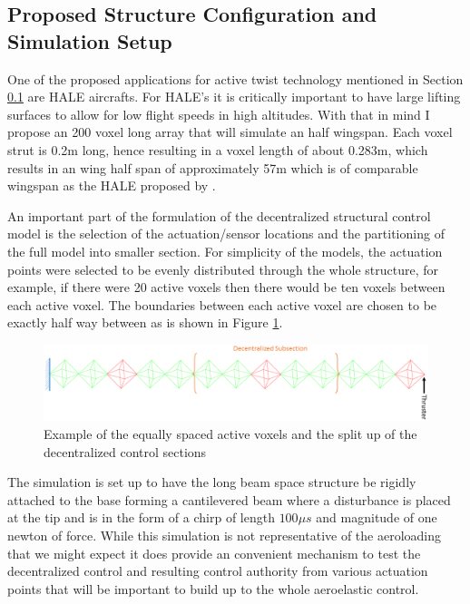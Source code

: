 \documentclass[11pt]{ucthesis}
\begin{document}
\subsection{Proposed Structure Configuration and Simulation Setup}
\label{sec:struct}
One of the proposed applications for active twist technology mentioned in Section \ref{sec:struct} are HALE aircrafts. For HALE's it is critically important to have large lifting surfaces to allow for low flight speeds in high altitudes. With that in mind I propose an 200 voxel long array that will simulate an half wingspan. Each voxel strut is 0.2m long, hence resulting in a voxel length of about 0.283m, which results in an wing half span of approximately 57m which is of comparable wingspan as the HALE proposed by \cite{goraj1999design}.

An important part of the formulation of the decentralized structural control model is the selection of the actuation/sensor locations and the partitioning of the full model into smaller section. For simplicity of the models, the actuation points were selected to be evenly distributed through the whole structure, for example, if there were 20 active voxels then there would be ten voxels between each active voxel. The boundaries between each active voxel are chosen to be exactly half way between as is shown in Figure \ref{fig:simSetup}.

\begin{figure}[thpb]
\centering
\includegraphics[width=1\linewidth]{Figures/SimulationSetup.png}
\caption{Example of the equally spaced active voxels and the split up of the decentralized control sections}
\label{fig:simSetup}
\end{figure}

The simulation is set up to have the long beam space structure be rigidly attached to the base forming a cantilevered beam where a disturbance is placed at the tip and is in the form of a chirp of length $100\mu s$ and magnitude of one newton of force. While this simulation is not representative of the aeroloading that we might expect it does provide an convenient mechanism to test the decentralized control and resulting control authority from various actuation points that will be important to build up to the whole aeroelastic control. 
\end{document}

